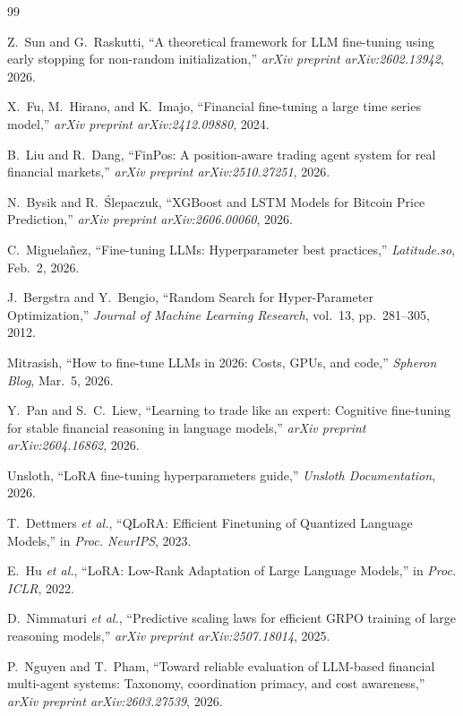 \documentclass[10pt,twocolumn]{article}
\begin{document}
\footnotesize
\begin{thebibliography}{99}

Z.~Sun and G.~Raskutti, ``A theoretical framework for LLM fine-tuning using early stopping for non-random initialization,'' \textit{arXiv preprint arXiv:2602.13942}, 2026.

X.~Fu, M.~Hirano, and K.~Imajo, ``Financial fine-tuning a large time series model,'' \textit{arXiv preprint arXiv:2412.09880}, 2024.

B.~Liu and R.~Dang, ``FinPos: A position-aware trading agent system for real financial markets,'' \textit{arXiv preprint arXiv:2510.27251}, 2026.

N.~Bysik and R.~\'Slepaczuk, ``XGBoost and LSTM Models for Bitcoin Price Prediction,'' \textit{arXiv preprint arXiv:2606.00060}, 2026.

C.~Miguela\~nez, ``Fine-tuning LLMs: Hyperparameter best practices,'' \textit{Latitude.so}, Feb.~2, 2026.

J.~Bergstra and Y.~Bengio, ``Random Search for Hyper-Parameter Optimization,'' \textit{Journal of Machine Learning Research}, vol.~13, pp.~281--305, 2012.

Mitrasish, ``How to fine-tune LLMs in 2026: Costs, GPUs, and code,'' \textit{Spheron Blog}, Mar.~5, 2026.

Y.~Pan and S.~C.~Liew, ``Learning to trade like an expert: Cognitive fine-tuning for stable financial reasoning in language models,'' \textit{arXiv preprint arXiv:2604.16862}, 2026.

Unsloth, ``LoRA fine-tuning hyperparameters guide,'' \textit{Unsloth Documentation}, 2026.

T.~Dettmers \textit{et al.}, ``QLoRA: Efficient Finetuning of Quantized Language Models,'' in \textit{Proc. NeurIPS}, 2023.

E.~Hu \textit{et al.}, ``LoRA: Low-Rank Adaptation of Large Language Models,'' in \textit{Proc. ICLR}, 2022.

D.~Nimmaturi \textit{et al.}, ``Predictive scaling laws for efficient GRPO training of large reasoning models,'' \textit{arXiv preprint arXiv:2507.18014}, 2025.

P.~Nguyen and T.~Pham, ``Toward reliable evaluation of LLM-based financial multi-agent systems: Taxonomy, coordination primacy, and cost awareness,'' \textit{arXiv preprint arXiv:2603.27539}, 2026.


\end{thebibliography}
\end{document}
